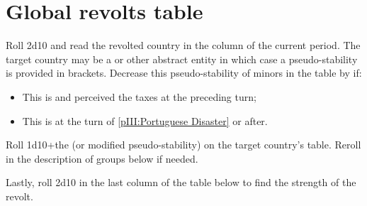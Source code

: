 



\section{Global revolts table}


\aparag Roll 2d10 and read the revolted country in the column of the current
period. The target country may be a \MIN or other abstract entity in which
case a pseudo-stability is provided in brackets.
\bparag Decrease this pseudo-stability of minors in the table by 
if:
\begin{itemize}
\item This is \HOLhol and \SPA perceived the taxes at the preceding turn;
\item This is \PORpor at the turn of \ref{pIII:Portuguese Disaster} or after.
\end{itemize}
\aparag Roll 1d10+the \STAB (or modified pseudo-stability) on the target
country's table. Reroll in the description of groups below if needed.

\aparag Lastly, roll 2d10 in the last column of the table below to find the
strength of the revolt.





\newcommand{\ANGrev}{\ANG} \newcommand{\AUSrev}{\AUS}
\newcommand{\DANrev}{\DAN} \newcommand{\FRArev}{\FRA}
\newcommand{\HISrev}{\HIS} \newcommand{\HOLrev}{\HOL}
\newcommand{\POLrev}{\POL} \newcommand{\PORrev}{\POR}
\newcommand{\PRUrev}{\PRU} \newcommand{\ROTWrev}{COL}
\newcommand{\RUSrev}{\RUS} \newcommand{\SUErev}{\SUE}
\newcommand{\TURrev}{\TUR} \newcommand{\VENrev}{\VEN}

